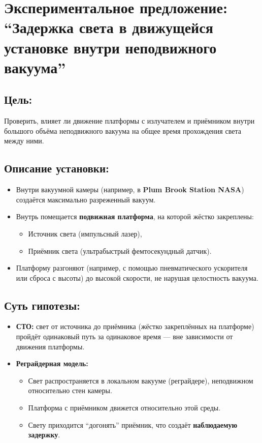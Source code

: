 \documentclass[12pt]{article}
\begin{document}
\section*{Экспериментальное предложение: “Задержка света в движущейся установке внутри неподвижного вакуума”}

\subsection*{Цель:}
Проверить, влияет ли движение платформы с излучателем и приёмником внутри большого объёма неподвижного вакуума на общее время прохождения света между ними.

\subsection*{Описание установки:}
\begin{itemize}
    \item Внутри вакуумной камеры (например, в \textbf{Plum Brook Station NASA}) создаётся максимально разреженный вакуум.
    \item Внутрь помещается \textbf{подвижная платформа}, на которой жёстко закреплены:
    \begin{itemize}
        \item Источник света (импульсный лазер),
        \item Приёмник света (ультрабыстрый фемтосекундный датчик).
    \end{itemize}
    \item Платформу разгоняют (например, с помощью пневматического ускорителя или сброса с высоты) до высокой скорости, не нарушая целостность вакуума.
\end{itemize}

\subsection*{Суть гипотезы:}
\begin{itemize}
    \item \textbf{СТО:} свет от источника до приёмника (жёстко закреплённых на платформе) пройдёт одинаковый путь за одинаковое время — вне зависимости от движения платформы.
    \item \textbf{Реграйдерная модель:}
    \begin{itemize}
        \item Свет распространяется в локальном вакууме (реграйдере), неподвижном относительно стен камеры.
        \item Платформа с приёмником движется относительно этой среды.
        \item Свету приходится “догонять” приёмник, что создаёт \textbf{наблюдаемую задержку}.
    \end{itemize}
\end{itemize}
\end{document}
